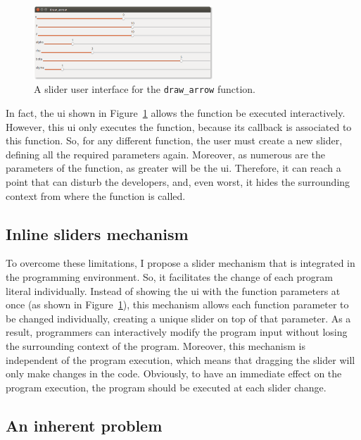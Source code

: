 \begin{figure}[h]
  \centering
  \includegraphics[width=0.6\textwidth]{images/slider-sample}
    \caption{A slider user interface for the \texttt{draw\_arrow} function.}
  \label{fig:slider-ui}
\end{figure}

In fact, the \gls{ui} shown in Figure~\ref{fig:slider-ui} allows the function  be executed interactively. However, this \gls{ui} only executes the  function, because its callback is associated to this function. So, for any different function, the user must create a new slider, defining all the required parameters again. Moreover, as numerous are the parameters of the function, as greater will be the \gls{ui}. Therefore, it can reach a point that can disturb the developers, and, even worst, it hides the surrounding context from where the function is called.

\subsection{Inline sliders mechanism}

To overcome these limitations, I propose a slider mechanism that is integrated in the programming environment. So, it facilitates the change of each program literal individually. Instead of showing the \gls{ui} with the function parameters at once (as shown in Figure~\ref{fig:slider-ui}), this mechanism allows each function parameter to be changed individually, creating a unique slider on top of that parameter. As a result, programmers can interactively modify the program input without losing the surrounding context of the program. Moreover, this mechanism is independent of the program execution, which means that dragging the slider will only make changes in the code. Obviously, to have an immediate effect on the program execution, the program should be executed at each slider change.

\subsection{An inherent problem}

